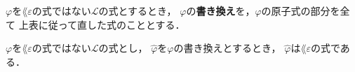 	\begin{screen}
		\begin{metadfn}[式の書き換え]
			$\varphi$を$\lang{\varepsilon}$の式ではない$\mathcal{L}$の式とするとき，
			$\varphi$の{\bf 書き換え}を，$\varphi$の原子式の部分を全て
			上表に従って直した式のこととする．
		\end{metadfn}
	\end{screen}
	
	\begin{screen}
		\begin{metathm}
		\label{metathm:rewritten_formulas_are_of_L_epsilon}
			$\varphi$を$\lang{\varepsilon}$の式ではない$\mathcal{L}$の式とし，
			$\widehat{\varphi}$を$\varphi$の書き換えとするとき，
			$\widehat{\varphi}$は$\lang{\varepsilon}$の式である．
		\end{metathm}
	\end{screen}
	
